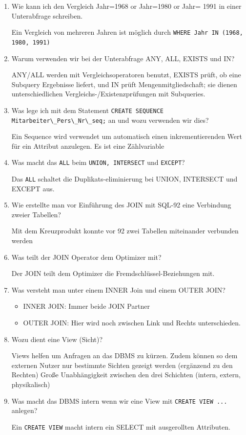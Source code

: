 \documentclass[a4paper]{article}
\begin{document}
\begin{enumerate}
    Subquery sind Abfragen um dynamisch Werte in einem anderem Query zu verwenden.
    \item Wie kann ich den Vergleich Jahr=1968 or Jahr=1980 or Jahr= 1991 in einer Unterabfrage schreiben.
    
    Ein Vergleich von mehreren Jahren ist möglich durch \lstinline|WHERE Jahr IN (1968, 1980, 1991)|
    \item Warum verwenden wir bei der Unterabfrage ANY, ALL, EXISTS und IN?
    
    ANY/ALL werden mit Vergleichsoperatoren benutzt, EXISTS prüft, ob eine Subquery Ergebnisse liefert, und IN prüft Mengenmitgliedschaft; sie dienen unterschiedlichen Vergleichs-/Existenzprüfungen mit Subqueries.
    \item Was lege ich mit dem Statement \lstinline|CREATE SEQUENCE Mitarbeiter\_Pers\_Nr\_seq;| an und wozu verwenden wir dies?
    
    Ein Sequence wird verwendet um automatisch einen inkrementierenden Wert für ein Attribut anzulegen. Es ist eine Zählvariable
    \item Was macht das \lstinline|ALL| beim \lstinline|UNION, INTERSECT| und \lstinline|EXCEPT|?
    
    Das \lstinline|ALL| schaltet die Duplikats-eliminierung bei UNION, INTERSECT und EXCEPT aus.
    \item Wie erstellte man vor Einführung des JOIN mit SQL-92 eine Verbindung zweier Tabellen?
    
    Mit dem Kreuzprodukt konnte vor 92 zwei Tabellen miteinander verbunden werden
    \item Was teilt der JOIN Operator dem Optimizer mit?
    
    Der JOIN teilt dem Optimizer die Fremdschlüssel-Beziehungen mit.
    \item Was versteht man unter einem INNER Join und einem OUTER JOIN?
    
    \begin{itemize}
        \item INNER JOIN: Immer beide JOIN Partner
        \item OUTER JOIN: Hier wird noch zwischen Link und Rechts unterschieden.
    \end{itemize}
    \item Wozu dient eine View (Sicht)?
    
    Views helfen um Anfragen an das DBMS zu kürzen. Zudem können so dem externen Nutzer nur bestimmte Sichten gezeigt werden (ergänzend zu den Rechten) Große Unabhängigkeit zwischen den drei Schichten (intern, extern, physikalisch)
    \item Was macht das DBMS intern wenn wir eine View mit \lstinline|CREATE VIEW ...| anlegen?
    
    Ein \lstinline|CREATE VIEW| macht intern ein SELECT mit ausgerollten Attributen.
\end{enumerate}
\end{document}
